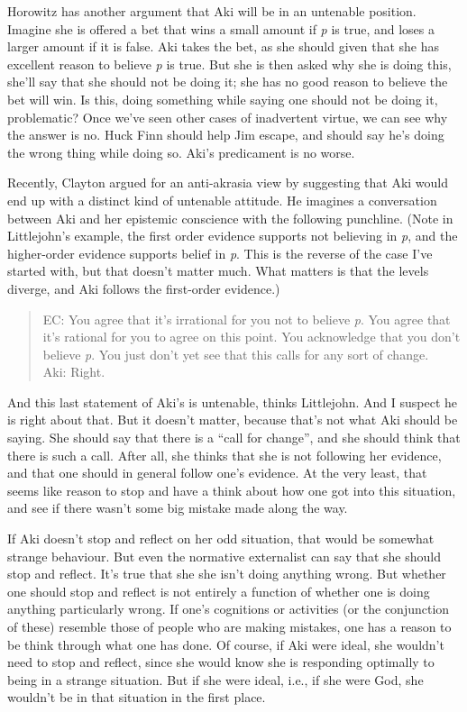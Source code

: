 Horowitz has another argument that \gls{Aki} will be in an untenable position. Imagine she is offered a bet that wins a small amount if \emph{p} is true, and loses a larger amount if it is false. \gls{Aki} takes the bet, as she should given that she has excellent reason to believe \emph{p} is true. But she is then asked why she is doing this, she'll say that she should not be doing it; she has no good reason to believe the bet will win. Is this, doing something while saying one should not be doing it, problematic? Once we've seen other cases of inadvertent virtue, we can see why the answer is no. \gls{Huck} Finn should help Jim escape, and should say he's doing the wrong thing while doing so. \gls{Aki}'s predicament is no worse.

Recently, Clayton \citet{Littlejohn2015} argued for an anti-akrasia view by suggesting that \gls{Aki} would end up with a distinct kind of untenable attitude. He imagines a conversation between \gls{Aki} and her epistemic conscience with the following punchline. (Note in Littlejohn's example, the first order evidence supports not believing in \emph{p}, and the higher-order evidence supports belief in \emph{p}. This is the reverse of the case I've started with, but that doesn't matter much. What matters is that the levels diverge, and Aki follows the first-order evidence.)

\begin{quote}
EC: You agree that it's irrational for you not to believe \emph{p}. You agree that it's rational for you to agree on this point. You acknowledge that you don't believe \emph{p}. You just don't yet see that this calls for any sort of change.\\
\gls{Aki}: Right. ~\citep[12, reference to preprint]{Littlejohn2015}
\end{quote}
And this last statement of \gls{Aki}'s is untenable, thinks Littlejohn. And I suspect he is right about that. But it doesn't matter, because that's not what \gls{Aki} should be saying. She should say that there is a ``call for change'', and she should think that there is such a call. After all, she thinks that she is not following her evidence, and that one should in general follow one's evidence. At the very least, that seems like reason to stop and have a think about how one got into this situation, and see if there wasn't some big mistake made along the way.

If \gls{Aki} doesn't stop and reflect on her odd situation, that would be somewhat strange behaviour. But even the normative externalist can say that she should stop and reflect. It's true that she she isn't doing anything wrong. But whether one should stop and reflect is not entirely a function of whether one is doing anything particularly wrong. If one's cognitions or activities (or the conjunction of these) resemble those of people who are making mistakes, one has a reason to be think through what one has done. Of course, if \gls{Aki} were ideal, she wouldn't need to stop and reflect, since she would know she is responding optimally to being in a strange situation. But if she were ideal, i.e., if she were God, she wouldn't be in that situation in the first place.

